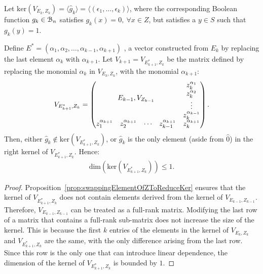 \documentclass[11pt]{llncs}
\begin{document}
\begin{proposition}\label{prop:constructionOfNextVRemovingAlphai}
    Let $\text{ker}(V_{E_k, Z_k}) =  \langle \hat{g}_k \rangle = \langle (\epsilon_1, \dots, \epsilon_k) \rangle$, where the corresponding Boolean function $g_k\in \mathcal{B}_{n}$ satisfies $g_k(x) = 0,\ \forall x\in Z$, but satisfies a $y\in S$ such that $g_k(y) = 1$.
    
    Define $E^{*} = (\alpha_1, \alpha_2, \dots, \alpha_{k-1}, \alpha_{k+1})$ , a vector constructed from $E_k$ by replacing the last element $\alpha_{k}$ with $\alpha_{k+1}$. 
    Let $V_{k+1} = V_{E^{*}_{k+1}, Z_k}$ be the matrix defined by replacing the monomial $\alpha_k$ in $V_{E_k, Z_k}$, with the monomial $\alpha_{k+1}$: 
    \begin{align*}
        V_{E^{*}_{k+1}, Z_{k}} = 
        \begin{pmatrix}
        \multicolumn{4}{c}{\multirow{4}{*}{$E_{k-1}, V_{Z_{k-1}}$}} & z_{k}^{\alpha_{1}}\\
        & & & & z_{k}^{\alpha_{2}}\\
        & & & & \vdots\\
        & & & & z_{k}^{\alpha_{k-1}}\\
        z_{1}^{\alpha_{k+1}} & z_{2}^{\alpha_{k+1}}& \cdots & z_{k-1}^{\alpha_{k+1}} & z_{k}^{\alpha_{k+1}}
    \end{pmatrix}.
    \end{align*}
    Then, either $\hat{g}_k \not\in \text{ker}(V_{E^{*}_{k+1}, Z_k})$, or $\hat{g}_k$ is the only element (aside from $\hat{0}$) in the right kernel of $V_{E_{k+1}^{*}, Z_k}$. Hence:
    \begin{align*}
        \text{dim}\left(\text{ker}(V_{E^{*}_{k+1}, Z_k})\right)\leq 1. 
    \end{align*}

\end{proposition}
\begin{proof}

    Proposition~\ref{prop:swappingElementOfZToReduceKer} ensures that the kernel of $V_{E^{*}_{k+1}, Z_{k}}$ does not contain elements derived from the kernel of $V_{ E_{k-1}, Z_{k-1}}$. 
    Therefore, $V_{E_{k-1}, Z_{k-1}}$ can be treated as a full-rank matrix.
    Modifying the last row of a matrix that contains a full-rank sub-matrix does not increase the size of the kernel. This is because the first $k$ entries of the elements in the kernel of $V_{E_k, Z_k }$ and $V_{E^{*}_{k+1}, Z_k}$ are the same, with the only difference arising from the last row. 
    Since this row is the only one that can introduce linear dependence, the dimension of the kernel of $V_{ E^{*}_{k+1}, Z_k}$ is bounded by $1$.
\end{proof}
\end{document}
